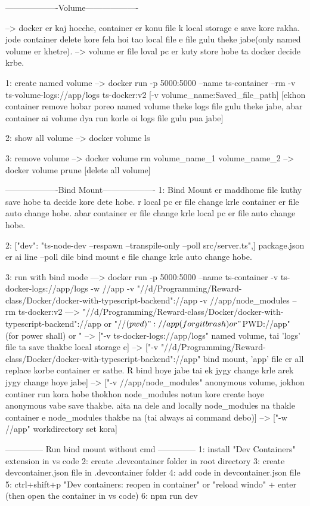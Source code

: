 -------------------Volume-------------------

--> docker er kaj hocche, container er konu file k local storage e save kore rakha. jode container delete kore fela hoi tao local file e file gulu theke jabe(only named volume er khetre).
--> volume er file loval pc er kuty store hobe ta docker decide krbe. 

1: create named volume
--> docker run -p 5000:5000 --name ts-container --rm -v ts-volume-logs://app/logs ts-docker:v2  [-v volume_name:Saved_file_path]
[ekhon container remove hobar poreo named volume theke logs file gulu theke jabe, abar container ai volume dya run korle oi logs file gulu pua jabe]

2: show all volume
--> docker volume ls

3: remove volume
--> docker volume rm volume_name_1 volume_name_2
--> docker volume prune [delete all volume]


-------------------Bind Mount-------------------
1: Bind Mount er maddhome file kuthy save hobe ta decide kore dete hobe. r local pc er file change krle container er file auto change hobe. abar container er file change krle local pc er file auto change hobe.

2: ["dev": "ts-node-dev --respawn --transpile-only --poll src/server.ts",]  package.json er ai line --poll dile bind mount e file change krle auto change hobe.

3: run with bind mode
---> docker run -p 5000:5000 --name ts-container -v ts-docker-logs://app/logs -w //app -v "//d/Programming/Reward-class/Docker/docker-with-typescript-backend"://app -v //app/node_modules --rm ts-docker:v2
---> "//d/Programming/Reward-class/Docker/docker-with-typescript-backend"://app or  "//$(pwd)"://app (for git brash) or "${PWD}://app" (for power shall) or "%
--> ["-v ts-docker-logs://app/logs" named volume, tai 'logs' file ta save thakbe local storage e]
--> ["-v "//d/Programming/Reward-class/Docker/docker-with-typescript-backend"://app" bind mount, 'app' file er all replace korbe container er sathe. R bind hoye jabe tai ek jygy change krle arek jygy change hoye jabe]
--> ["-v //app/node_modules" anonymous volume, jokhon continer run kora hobe thokhon node_modules notun kore create hoye anonymous vabe save thakbe. aita na dele and locally node_modules na thakle container e node_modules thakbe na (tai always ai command debo)]
--> ["-w //app" workdirectory set kora]


-------------- Run bind mount without cmd --------------
1: install "Dev Containers" extension in vs code
2: create .devcontainer folder in root directory
3: create devcontainer.json file in .devcontainer folder
4: add code in devcontainer.json file
5: ctrl+shift+p "Dev containers: reopen in container" or "reload windo" + enter (then open the container in vs code)
6: npm run dev

